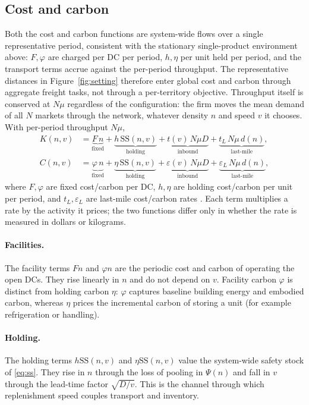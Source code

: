 \documentclass[11pt]{article}
\theoremstyle{definition}
\theoremstyle{remark}
\theoremstyle{plain}
\newcommand{\sstock}{\mathrm{SS}}
\begin{document}
\subsection{Cost and carbon}

Both the cost and carbon functions are system-wide flows over a single
representative period, consistent with the stationary single-product environment above:
$F,\varphi$ are charged per DC per period, $h,\eta$ per unit held per period, and the transport terms accrue
against the per-period throughput. The representative distances in Figure~\ref{fig:setting} therefore enter
global cost and carbon through aggregate freight tasks, not through a per-territory objective. Throughput
itself is conserved at $N\mu$ regardless of the configuration: the firm moves the mean demand of all $N$
markets through the network, whatever density $n$ and speed $v$ it chooses. With per-period throughput
$N\mu$,
\begin{align}
  K(n,v) &= \underbrace{F\,n}_{\text{fixed}} + \underbrace{h\,\sstock(n,v)}_{\text{holding}}
            + \underbrace{t(v)\,N\mu D}_{\text{inbound}} + \underbrace{t_L\,N\mu\,d(n)}_{\text{last-mile}},
            \label{eq:K}\\[2pt]
  C(n,v) &= \underbrace{\varphi\,n}_{\text{fixed}} + \underbrace{\eta\,\sstock(n,v)}_{\text{holding}}
            + \underbrace{\varepsilon(v)\,N\mu D}_{\text{inbound}} + \underbrace{\varepsilon_L\,N\mu\,d(n)}_{\text{last-mile}},
            \label{eq:C}
\end{align}
where $F,\varphi$ are fixed cost/carbon per DC, $h,\eta$ are holding cost/carbon per unit per period, and
$t_L,\varepsilon_L$ are last-mile cost/carbon rates \citep{shen2003joint, hua2011managing,
benjaafar2013carbon}. Each term multiplies a rate by the activity it prices; the two functions differ only in
whether the rate is measured in dollars or kilograms.

\paragraph{Facilities.} The facility terms $F n$ and $\varphi n$ are the periodic cost and carbon of operating
the open DCs. They rise linearly in $n$ and do not depend on $v$. Facility carbon $\varphi$ is distinct from
holding carbon $\eta$: $\varphi$ captures baseline building energy and embodied carbon, whereas $\eta$ prices
the incremental carbon of storing a unit (for example refrigeration or handling).

\paragraph{Holding.} The holding terms $h\sstock(n,v)$ and $\eta\sstock(n,v)$ value the system-wide safety
stock of \eqref{eq:ss}. They rise in $n$ through the loss of pooling in $\Psi(n)$ and fall in $v$ through the
lead-time factor $\sqrt{D/v}$. This is the channel through which replenishment speed couples transport and
inventory.
\end{document}
